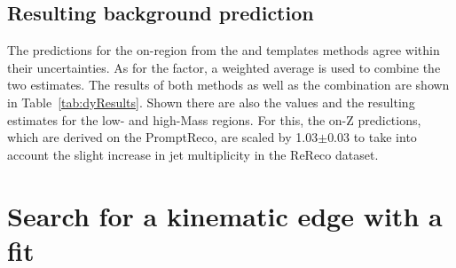 \subsection{Resulting background prediction}
The predictions for the on-\Z region from the \JZB and \MET templates methods agree within their uncertainties. As for the \Rsfof factor, a weighted average is used to combine the two estimates. The results of both methods as well as the combination are shown in Table~\ref{tab:dyResults}. Shown there are also the \Routin values and the resulting estimates for the low- and high-Mass regions. For this, the on-Z predictions, which are derived on the PromptReco, are scaled by 1.03$\pm$0.03 to take into account the slight increase in jet multiplicity in the ReReco dataset. 






\section{Search for a kinematic edge with a fit}
